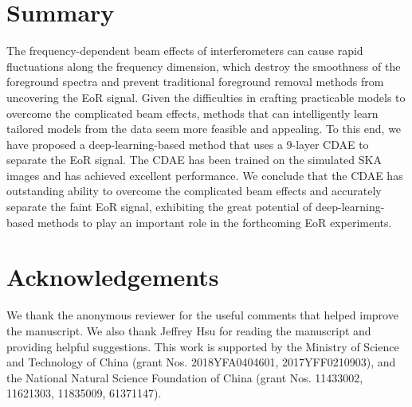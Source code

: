 \documentclass[fleqn,usenatbib]{mnras}
\begin{document}
\section{Summary}
\label{sec:summary}

The frequency-dependent beam effects of interferometers can cause
rapid fluctuations along the frequency dimension,
which destroy the smoothness of the foreground spectra and prevent
traditional foreground removal methods from uncovering the EoR signal.
Given the difficulties in crafting practicable models to overcome the
complicated beam effects, methods that can intelligently learn tailored
models from the data seem more feasible and appealing.
To this end, we have proposed a deep-learning-based method that uses
a 9-layer CDAE to separate the EoR signal.
The CDAE has been trained on the simulated SKA images and has achieved
excellent performance.
We conclude that the CDAE has outstanding ability to overcome the
complicated beam effects and accurately separate the faint EoR signal,
exhibiting the great potential of deep-learning-based methods
to play an important role in the forthcoming EoR experiments.


\section*{Acknowledgements}

We thank the anonymous reviewer for the useful comments that helped
improve the manuscript.
We also thank Jeffrey Hsu for reading the manuscript and providing
helpful suggestions.
This work is supported by
the Ministry of Science and Technology of China
(grant Nos. 2018YFA0404601, 2017YFF0210903),
and the National Natural Science Foundation of China
(grant Nos. 11433002, 11621303, 11835009, 61371147).










\bsp	%
\label{lastpage}
\end{document}
